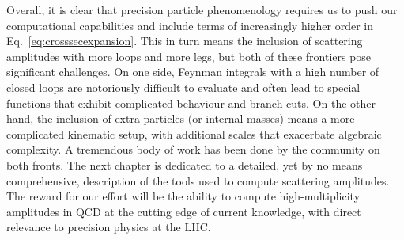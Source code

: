 \documentclass[main.tex]{subfiles}
\begin{document}
Overall, it is clear that precision particle phenomenology requires us to push our computational capabilities and include terms of increasingly higher order in Eq.~\ref{eq:crosssecexpansion}. This in turn means the inclusion of scattering amplitudes with more loops and more legs, but both of these frontiers pose significant challenges. On one side, Feynman integrals with a high number of closed loops are notoriously difficult to evaluate and often lead to special functions that exhibit complicated behaviour and branch cuts. On the other hand, the inclusion of extra particles (or internal masses) means a more complicated kinematic setup, with additional scales that exacerbate algebraic complexity. A tremendous body of work has been done by the community on both fronts. The next chapter is dedicated to a detailed, yet by no means comprehensive, description of the tools used to compute scattering amplitudes. The reward for our effort will be the ability to compute high-multiplicity amplitudes in QCD at the cutting edge of current knowledge, with direct relevance to precision physics at the LHC.
\end{document}
